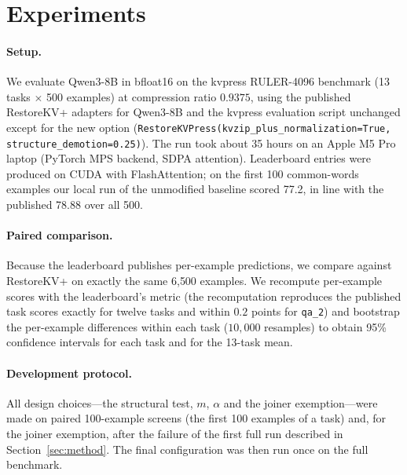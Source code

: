 \documentclass[11pt]{article}
\begin{document}
\section{Experiments}
\label{sec:experiments}
\paragraph{Setup.} We evaluate Qwen3-8B in bfloat16 on the kvpress RULER-4096 benchmark (13 tasks $\times$ 500 examples) at
compression ratio $0.9375$, using the published RestoreKV+ adapters for Qwen3-8B and the kvpress evaluation script unchanged except
for the new option (\texttt{RestoreKVPress(kvzip\_\allowbreak plus\_\allowbreak normalization=True,\allowbreak{} structure\_\allowbreak demotion=0.25)}). The run took about 35
hours on an Apple M5 Pro laptop (PyTorch MPS backend, SDPA attention). Leaderboard entries were produced on CUDA with
FlashAttention; on the first 100 common-words examples our local run of the unmodified baseline scored 77.2, in line with the
published 78.88 over all 500.

\paragraph{Paired comparison.} Because the leaderboard publishes per-example predictions, we compare against RestoreKV+ on exactly
the same 6{,}500 examples. We recompute per-example scores with the leaderboard's metric (the recomputation reproduces the
published task scores exactly for twelve tasks and within $0.2$ points for \texttt{qa\_2}) and bootstrap the per-example differences
within each task ($10{,}000$ resamples) to obtain 95\% confidence intervals for each task and for the 13-task mean.

\paragraph{Development protocol.} All design choices---the structural test, $m$, $\alpha$ and the joiner exemption---were made on
paired 100-example screens (the first 100 examples of a task) and, for the joiner exemption, after the failure of the first full
run described in Section~\ref{sec:method}. The final configuration was then run once on the full benchmark.
\end{document}

